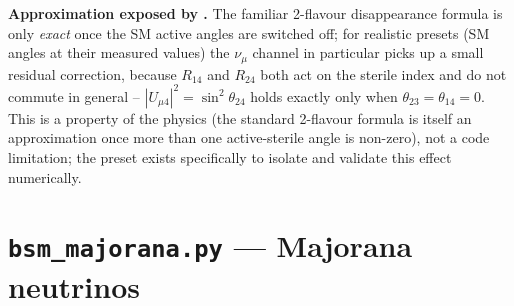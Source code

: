 \begin{notebox}
\textbf{Approximation exposed by .}
The familiar 2-flavour disappearance formula is only \emph{exact} once the
SM active angles are switched off; for realistic presets (SM angles at
their measured values) the $\nu_\mu$ channel in particular picks up a small
residual correction, because $R_{14}$ and $R_{24}$ both act on the sterile
index and do not commute in general -- $|U_{\mu4}|^2=\sin^2\theta_{24}$
holds exactly only when $\theta_{23}=\theta_{14}=0$. This is a property of
the physics (the standard 2-flavour formula is itself an approximation once
more than one active-sterile angle is non-zero), not a code limitation; the
preset exists specifically to isolate and validate this effect
numerically.
\end{notebox}

\section{\texttt{bsm\_majorana.py} --- Majorana neutrinos}
\label{sec:bsm-majorana}


